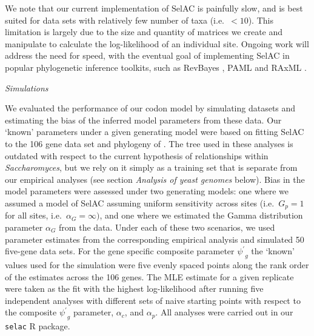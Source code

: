 \documentclass[12pt,letterpaper]{article}
\renewcommand{\subsection}[1]{%
\bigskip
\begin{center}
\begin{large}
\normalfont\itshape #1
\end{large}
\end{center}}
\newcommand{\selac}{SelAC\xspace}
\newcommand{\alphac}{\ensuremath{\alpha_c}\xspace}
\newcommand{\alphag}{\ensuremath{\alpha_G}\xspace}
\newcommand{\alphap}{\ensuremath{\alpha_p}\xspace}
\newcommand{\psiprime}{\ensuremath{\psi^\prime}\xspace}
\newcommand{\gp}{\ensuremath{{G_p}}\xspace}
\begin{document}
We note that our current implementation of \selac is painfully slow, and is best suited for data sets with relatively few number of taxa (i.e.~$<10$).
This limitation is largely due to the size and quantity of matrices we create and manipulate to calculate the log-likelihood of an individual site.
Ongoing work will address the need for speed, with the eventual goal of implementing \selac in popular phylogenetic inference toolkits, such as RevBayes \citep{revbayes}, PAML \citep{Yang2007} and RAxML \citep{Stamatakis2006}.

\subsection{Simulations}
We evaluated the performance of our codon model by simulating datasets and estimating the bias of the inferred model parameters from these data.
Our `known' parameters under a given generating model were based on fitting SelAC to the 106 gene data set and phylogeny of \citet{RokasEtAl2003}.
The tree used in these analyses is outdated with respect to the current hypothesis of relationships within \emph{Saccharomyces}, but we rely on it simply as a training set that is separate from our empirical analyses (see section \emph{Analysis of yeast genomes} below).
Bias in the model parameters were assessed under two generating models: one where we assumed a model of SelAC assuming uniform sensitivity across sites (i.e.~$\gp = 1$ for all sites, i.e.~$\alphag = \infty)$, and one where we estimated the Gamma distribution parameter $\alphag$ from the data.
Under each of these two scenarios, we used parameter estimates from the corresponding empirical analysis and simulated 50 five-gene data sets.
For the gene specific composite parameter $\psiprime_g$ the `known' values used for the simulation were five evenly spaced points along the rank order of the estimates across the 106 genes.
The MLE estimate for a given replicate were taken as the fit with the highest log-likelihood after running five independent analyses with different sets of naive starting points with respect to the composite $\psiprime_g$ parameter, $\alphac$, and $\alphap$.
All analyses were carried out in our \texttt{selac} R package.
\end{document}
